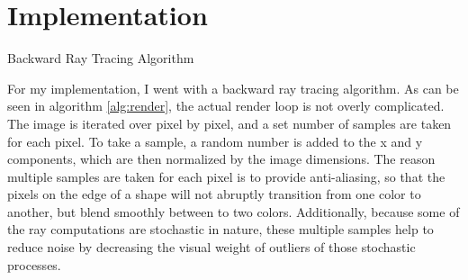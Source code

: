 \documentclass{IEEEtran}
\begin{document}
\section*{Implementation}

\begin{algorithm}[b]
    \caption{Backward Ray Tracing Algorithm}\label{alg:render}
\end{algorithm}

For my implementation, I went with a backward ray tracing algorithm. As can be seen in algorithm
\ref{alg:render}, the actual render loop is not overly complicated. The image is iterated over pixel
by pixel, and a set number of samples are taken for each pixel. To take a sample, a random number is
added to the x and y components, which are then normalized by the image dimensions. The reason
multiple samples are taken for each pixel is to provide anti-aliasing, so that the pixels on the
edge of a shape will not abruptly transition from one color to another, but blend smoothly between
to two colors. Additionally, because some of the ray computations are stochastic in nature, these
multiple samples help to reduce noise by decreasing the visual weight of outliers of those
stochastic processes.
\end{document}

